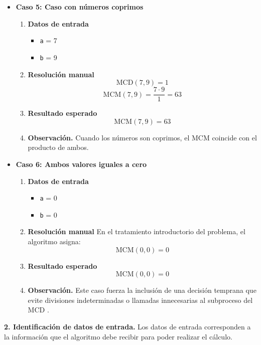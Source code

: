 \documentclass[12pt,twoside]{book}
\begin{document}
\begin{itemize}
							\item \textbf{Caso 5: Caso con números coprimos}
							\begin{enumerate}
								\item \textbf{Datos de entrada}
								\begin{itemize}
									\item \texttt{a} = 7
									\item \texttt{b} = 9
								\end{itemize}
								\item \textbf{Resolución manual}
								\[
								\text{MCD}(7,9)=1
								\]
								\[
								\text{MCM}(7,9)=\frac{7\cdot 9}{1}=63
								\]
								\item \textbf{Resultado esperado}
								\[
								\text{MCM}(7,9)=63
								\]
								\item \textbf{Observación.} Cuando los números son coprimos, el MCM coincide con el producto de ambos.
							\end{enumerate}
							
							\item \textbf{Caso 6: Ambos valores iguales a cero}
							\begin{enumerate}
								\item \textbf{Datos de entrada}
								\begin{itemize}
									\item \texttt{a} = 0
									\item \texttt{b} = 0
								\end{itemize}
								\item \textbf{Resolución manual}
								En el tratamiento introductorio del problema, el algoritmo asigna:
								\[
								\text{MCM}(0,0)=0
								\]
								\item \textbf{Resultado esperado}
								\[
								\text{MCM}(0,0)=0
								\]
								\item \textbf{Observación.} Este caso fuerza la inclusión de una decisión temprana que evite divisiones indeterminadas o llamadas innecesarias al subproceso del MCD \cite{Pressman2019Software,Sommerville2015Software}.
							\end{enumerate}
						\end{itemize}
						
						\noindent
						\textbf{2. Identificación de datos de entrada.}
						Los datos de entrada corresponden a la información que el algoritmo debe recibir para poder realizar el cálculo.
						
\end{document}

